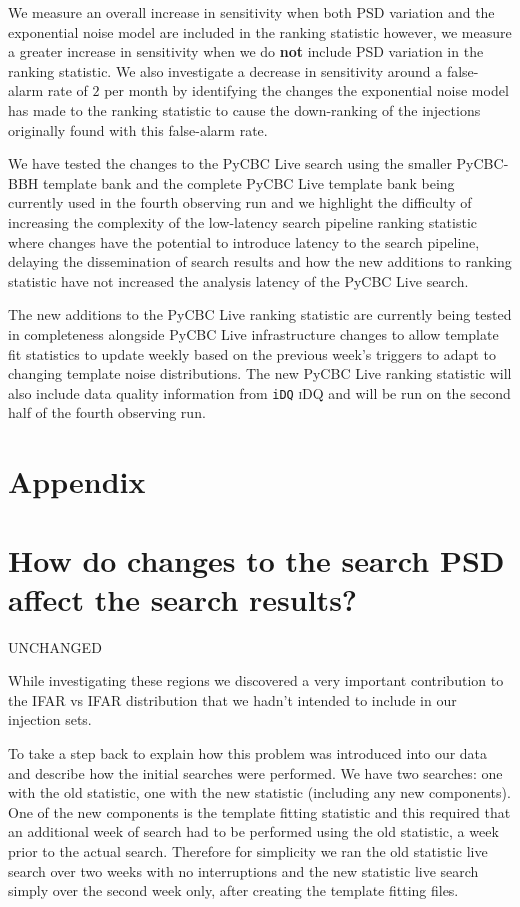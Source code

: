 We measure an overall increase in sensitivity when both PSD variation and the exponential noise model are included in the ranking statistic however, we measure a greater increase in sensitivity when we do \textbf{not} include PSD variation in the ranking statistic. We also investigate a decrease in sensitivity around a false-alarm rate of $2$ per month by identifying the changes the exponential noise model has made to the ranking statistic to cause the down-ranking of the injections originally found with this false-alarm rate.

We have tested the changes to the PyCBC Live search using the smaller PyCBC-BBH template bank and the complete PyCBC Live template bank being currently used in the fourth observing run and we highlight the difficulty of increasing the complexity of the low-latency search pipeline ranking statistic where changes have the potential to introduce latency to the search pipeline, delaying the dissemination of search results and how the new additions to ranking statistic have not increased the analysis latency of the PyCBC Live search.

The new additions to the PyCBC Live ranking statistic are currently being tested in completeness alongside PyCBC Live infrastructure changes to allow template fit statistics to update weekly based on the previous week's triggers to adapt to changing template noise distributions. The new PyCBC Live ranking statistic will also include data quality information from \verb|iDQ| \textsc{iDQ} and will be run on the second half of the fourth observing run.




\section*{Appendix}
\section{\label{5:sec:diff-start-times}How do changes to the search PSD affect the search results?}

UNCHANGED

While investigating these regions we discovered a very important contribution to the IFAR vs IFAR distribution that we hadn't intended to include in our injection sets. 

To take a step back to explain how this problem was introduced into our data and describe how the initial searches were performed. We have two searches: one with the old statistic, one with the new statistic (including any new components). One of the new components is the template fitting statistic and this required that an additional week of search had to be performed using the old statistic, a week prior to the actual search. Therefore for simplicity we ran the old statistic live search over two weeks with no interruptions and the new statistic live search simply over the second week only, after creating the template fitting files.

